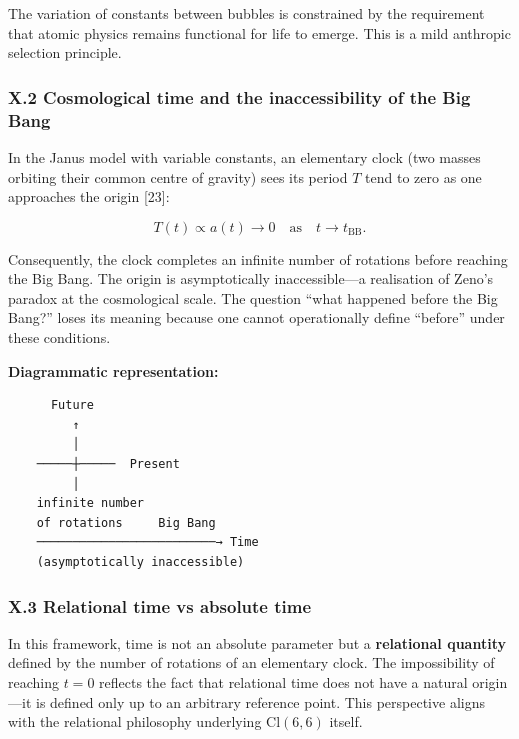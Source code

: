 \documentclass[11pt]{article}
\begin{document}
The variation of constants between bubbles is constrained by the
requirement that atomic physics remains functional for life to emerge.
This is a mild anthropic selection principle.

\hypertarget{x.2-cosmological-time-and-the-inaccessibility-of-the-big-bang}{%
\subsubsection{X.2 Cosmological time and the inaccessibility of the Big
Bang}\label{x.2-cosmological-time-and-the-inaccessibility-of-the-big-bang}}

In the Janus model with variable constants, an elementary clock (two
masses orbiting their common centre of gravity) sees its period \(T\)
tend to zero as one approaches the origin {[}23{]}:

\[
T(t) \propto a(t) \to 0 \quad \text{as} \quad t \to t_{\text{BB}}.
\]

Consequently, the clock completes an infinite number of rotations before
reaching the Big Bang. The origin is asymptotically inaccessible---a
realisation of Zeno's paradox at the cosmological scale. The question
``what happened before the Big Bang?'' loses its meaning because one
cannot operationally define ``before'' under these conditions.

\textbf{Diagrammatic representation:}

\begin{verbatim}
      Future
         ↑
         │
    ─────┼─────  Present
         │
    infinite number
    of rotations     Big Bang
    ─────────────────────────→ Time
    (asymptotically inaccessible)
\end{verbatim}

\hypertarget{x.3-relational-time-vs-absolute-time}{%
\subsubsection{X.3 Relational time vs absolute
time}\label{x.3-relational-time-vs-absolute-time}}

In this framework, time is not an absolute parameter but a
\textbf{relational quantity} defined by the number of rotations of an
elementary clock. The impossibility of reaching \(t=0\) reflects the
fact that relational time does not have a natural origin---it is defined
only up to an arbitrary reference point. This perspective aligns with
the relational philosophy underlying \(\text{Cl}(6,6)\) itself.
\end{document}
